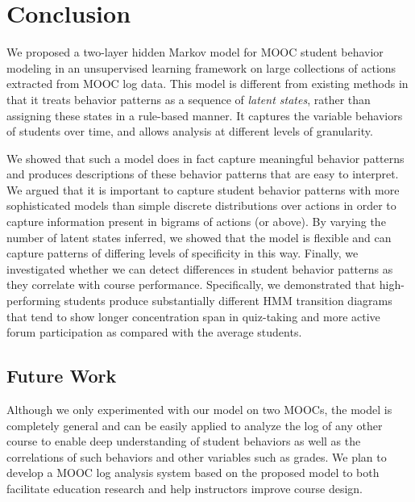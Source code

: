 \section{Conclusion}
We proposed a two-layer hidden Markov model for MOOC student behavior
modeling in an unsupervised learning framework on large collections of
actions extracted from MOOC log data. This model is different from existing
methods in that it treats behavior patterns as a sequence of \emph{latent
states}, rather than assigning these states in a rule-based manner. It
captures the variable behaviors of students over time, and allows
analysis at different levels of granularity.

We showed that such a model does in fact capture meaningful behavior
patterns and produces descriptions of these behavior patterns that are easy
to interpret. We argued that it is important to capture student behavior
patterns with more sophisticated models than simple discrete distributions
over actions in order to capture information present in bigrams of actions
(or above). By varying the number of latent
states inferred, we showed that the model is flexible and can capture
patterns of differing levels of specificity in this way.  Finally, we
investigated whether we can detect differences in student behavior patterns
as they correlate with course performance. Specifically, we demonstrated
that high-performing students produce substantially different HMM
transition diagrams that tend to show longer concentration span in quiz-taking
and more active  forum participation as compared with the average students.

\subsection{Future Work}

Although we only experimented with our model on two MOOCs, the model is
completely general and can be easily applied to analyze the log of any
other course to enable deep understanding of student behaviors as well as
the correlations of such behaviors and other variables such as grades. We
plan to develop a MOOC log analysis system based on the proposed model to
both facilitate education research and help instructors improve course
design.

